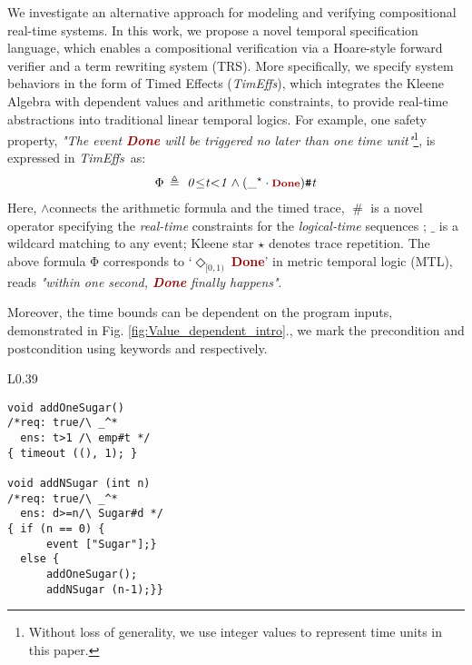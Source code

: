 \documentclass[acmsmall,10pt,review]{acmart}
\newcommand{\timedEffects}{\emph{TimEffs}}
\newcommand{\effect}{{\ensuremath{\mathrm{\Phi}}}}
\newcommand{\anyevent}[1]{{\textcolor{darkred}
{{\textbf{\footnotesize #1}}}}}
\newcommand{\code}[1]{{\tt{\ensuremath{\m{#1}}}}}
\newcommand{\m}{\mathit}
\newcommand{\mysharp}{{\mathrel{\texttt{\#}}}}
\def\defeq{\ensuremath{\,\triangleq}}
\newcommand\figref[1]{Fig. \textcolor{black}{\ref{#1}}.}
\begin{document}
We investigate an alternative approach for modeling and verifying 
compositional real-time systems. In this work, 
we propose a novel temporal specification language, 
which enables a compositional verification via a  Hoare-style 
forward verifier and a term rewriting system (TRS). 
More specifically, we specify system behaviors in the form of 
{Timed Effects} (\timedEffects), which integrates the Kleene Algebra 
with dependent values and arithmetic constraints, 
to 
provide real-time abstractions into traditional linear temporal logics. 
For example, one safety property, \textit{"The event \anyevent{Done} 
will be triggered no later than one time unit"}\footnote{Without loss of generality, 
we use integer values to represent time units in this 
paper.%
}, is expressed in \timedEffects\ as: 
\begin{align*}
  \code{\effect \defeq \  0 {\leq} t {<}1 \wedge ({\_^\star} \cdot \anyevent{Done} ) \mysharp  t}
\end{align*}  
Here, \code \wedge  connects the arithmetic formula and the timed trace, \code{\mysharp } is a novel operator specifying the \emph{real-time} 
constraints for the \emph{logical-time} sequences \cite{DBLP:conf/fdl/HanxledenBG17}; 
\code{\_} is a wildcard matching to any event; 
Kleene star \code{\star} denotes trace repetition.
The above formula \code{\effect} corresponds to `\code{\Diamond_{[0, 1)}\ }\anyevent{Done}' 
in metric temporal logic (MTL), reads \textit{"within one second, 
\anyevent{Done} finally happens"}. 

Moreover, the time bounds 
can be dependent on the program inputs, demonstrated in \figref{fig:Value_dependent_intro}, we mark the precondition and postcondition
using keywords {\color{darklavender}\code{\emph{req:}}} and {\color{darklavender}\code{\emph{ens:}}} respectively. 


\begin{wrapfigure}{L}{0.39\columnwidth}
\begin{lstlisting}[name=coffee]
void addOneSugar() 
/*req: true/\ _^*
  ens: t>1 /\ emp#t */ 
{ timeout ((), 1); }

void addNSugar (int n) 
/*req: true/\ _^*
  ens: d>=n/\ Sugar#d */
{ if (n == 0) { 
      event ["Sugar"];} 
  else {
      addOneSugar();
      addNSugar (n-1);}} 
\end{lstlisting}
\caption{Value-dependent specification.} 
\label{fig:Value_dependent_intro}
\vspace{0mm}
\end{wrapfigure}
\end{document}
